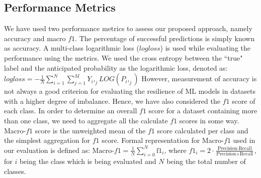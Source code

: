 \documentclass[pdflatex,sn-mathphys]{sn-jnl}%
\begin{document}
\subsection{Performance Metrics}
We have used two performance metrics to assess our proposed  approach, namely accuracy and macro $f1$. The percentage of successful predictions is simply known as accuracy. 
A multi-class logarithmic loss ($logloss$) is used while evaluating the performance using the metrics. We used the cross entropy between the ``true" label and the anticipated probability as the logarithmic loss, denoted as: $\displaystyle
logloss = -\frac{1}{N}\displaystyle\sum_{i=1} ^{N}\displaystyle\sum_{j=1} ^{M}Y_i,_jLOG(P_i,_j)
$
However, measurement of accuracy is not always a good criterion for evaluating the resilience of ML models in datasets with a higher degree of imbalance. Hence, we have also considered the $f1$ score of each class. In order to determine an overall $f1$ score for a dataset containing more than one class, we need to aggregate all the calculate $f1$ scores in some way. Macro-$f1$ score is the unweighted mean of the $f1$ score calculated per class and  the simplest aggregation for $f1$ score. Formal representation for Macro-$f1$ used in our evaluation is defined as: $\displaystyle
\text{Macro-$f1$}  =  \frac{1}{N} \sum_{i=0}^{N} {\text{f1}_i}$,
where
$\displaystyle
\text{${f1}_i$}  =  2 \cdot \frac{\text{Precision} \cdot \text{Recall}}{\text{Precision} + \text{Recall}}$, for $i$ being the class which is being evaluated and $N$ being the total number of classes.
\end{document}
